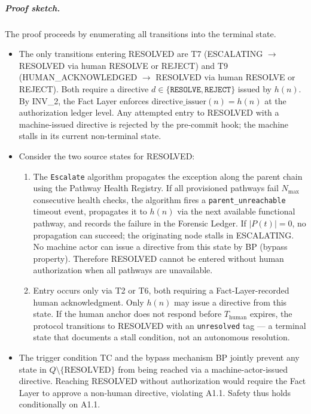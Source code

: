 \subparagraph{Proof sketch.} The proof proceeds by enumerating all transitions into the terminal state.

\begin{itemize}
\item[Step 1.] The only transitions entering RESOLVED are T7 (ESCALATING $\rightarrow$ RESOLVED via human RESOLVE or REJECT) and T9 (HUMAN\_ACKNOWLEDGED $\rightarrow$ RESOLVED via human RESOLVE or REJECT). Both require a directive $d \in \{\texttt{RESOLVE}, \texttt{REJECT}\}$ issued by $h(n)$. By INV\_2, the Fact Layer enforces $\text{directive\_issuer}(n) = h(n)$ at the authorization ledger level. Any attempted entry to RESOLVED with a machine-issued directive is rejected by the pre-commit hook; the machine stalls in its current non-terminal state.

\item[Step 2.] Consider the two source states for RESOLVED:
\begin{enumerate}
\item[\textbf{ESCALATING}:] The \texttt{Escalate} algorithm propagates the exception along the parent chain using the Pathway Health Registry. If all provisioned pathways fail $N_{\max}$ consecutive health checks, the algorithm fires a \texttt{parent\_unreachable} timeout event, propagates it to $h(n)$ via the next available functional pathway, and records the failure in the Forensic Ledger. If $|P(t)| = 0$, no propagation can succeed; the originating node stalls in ESCALATING. No machine actor can issue a directive from this state by BP (bypass property). Therefore RESOLVED cannot be entered without human authorization when all pathways are unavailable.
\item[\textbf{HUMAN\_ACKNOWLEDGED}:] Entry occurs only via T2 or T6, both requiring a Fact-Layer-recorded human acknowledgment. Only $h(n)$ may issue a directive from this state. If the human anchor does not respond before $T_{\text{human}}$ expires, the protocol transitions to RESOLVED with an \texttt{unresolved} tag — a terminal state that documents a stall condition, not an autonomous resolution.
\end{enumerate}
\item[Step 3.] The trigger condition TC and the bypass mechanism BP jointly prevent any state in $Q \setminus \{\text{RESOLVED}\}$ from being reached via a machine-actor-issued directive. Reaching RESOLVED without authorization would require the Fact Layer to approve a non-human directive, violating A1.1. Safety thus holds conditionally on A1.1.
\end{itemize}

